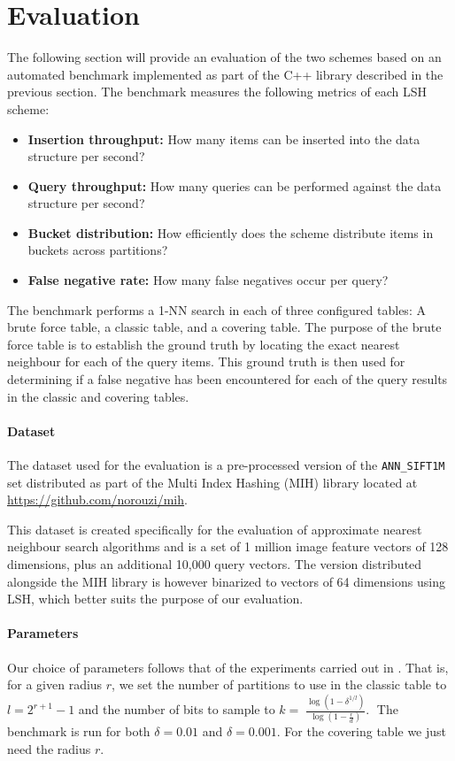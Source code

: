 \section{Evaluation}
\label{evaluation}

The following section will provide an evaluation of the two schemes based on an automated benchmark implemented as part of the C++ library described in the previous section. The benchmark measures the following metrics of each LSH scheme:

\begin{itemize}
  \item \textbf{Insertion throughput:} How many items can be inserted into the data structure per second?
  \item \textbf{Query throughput:} How many queries can be performed against the data structure per second?
  \item \textbf{Bucket distribution:} How efficiently does the scheme distribute items in buckets across partitions?
  \item \textbf{False negative rate:} How many false negatives occur per query?
\end{itemize}

The benchmark performs a 1-NN search in each of three configured tables: A brute force table, a classic table, and a covering table. The purpose of the brute force table is to establish the ground truth by locating the exact nearest neighbour for each of the query items. This ground truth is then used for determining if a false negative has been encountered for each of the query results in the classic and covering tables.

\paragraph{Dataset} The dataset used for the evaluation is a pre-processed version of the \texttt{ANN\_SIFT1M} set distributed as part of the Multi Index Hashing (MIH) library located at \url{https://github.com/norouzi/mih}.

This dataset is created specifically for the evaluation of approximate nearest neighbour search algorithms and is a set of 1 million image feature vectors of 128 dimensions, plus an additional 10,000 query vectors. The version distributed alongside the MIH library is however binarized to vectors of 64 dimensions using LSH, which better suits the purpose of our evaluation.

\paragraph{Parameters} Our choice of parameters follows that of the experiments carried out in \cite{DBLP:journals/corr/PhamP16}. That is, for a given radius $r$, we set the number of partitions to use in the classic table to $l = 2^{r + 1} - 1$ and the number of bits to sample to $k = 􏰢\frac{\log(1 - \delta^{1 / l})}{\log(1 - \frac{r}{d})}$.􏰣 The benchmark is run for both $\delta = 0.01$ and $\delta = 0.001$. For the covering table we just need the radius $r$. 

